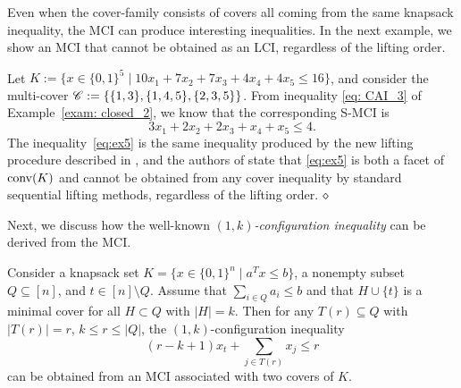 Even when the cover-family consists of covers all coming from the same knapsack inequality, the MCI can produce interesting inequalities. In the next example, we show an MCI that cannot be obtained as an LCI, regardless of the lifting order.

\begin{example}
\label{exmp: 3}
Let $K := \{x \in \{0,1\}^5 \mid 10 x_1 + 7 x_2 + 7 x_3 + 4 x_4 + 4 x_5 \leq 16\}$, and consider the multi-cover $\mathscr{C}: = \{ \{1, 3\}, \{1, 4, 5\}, \{2, 3, 5\}\}$. 
From inequality \eqref{eq: CAI_3} of Example~\ref{exam: closed_2}, we know that the corresponding S-MCI is
\begin{equation}
    3x_1 + 2x_2 + 2x_3 + x_4 + x_5 \leq 4. \label{eq:ex5}
\end{equation}
The inequality~\eqref{eq:ex5} is the same inequality produced by the new lifting procedure described in \cite{letchford2019lifted}, and the authors of \cite{letchford2019lifted} state that \eqref{eq:ex5} is both a facet of $\operatorname{conv}(K)$ and cannot be obtained from any cover inequality by standard sequential lifting methods, regardless of the lifting order.
$\hfill \diamond$
\end{example}

Next, we discuss how the well-known \emph{$(1,k)$-configuration inequality} can be derived from the MCI.

\begin{proposition}
\label{prop: 1-k-AMCI}
Consider a knapsack set $K = \{x \in \{0,1\}^n \mid a^T x \leq b\}$, a nonempty subset $Q \subseteq [n]$, and $t \in [n] \setminus Q$. 
Assume that $\sum_{i \in Q} a_i \leq b$ and that $H \cup \{t\}$ is a minimal cover for all $H \subset Q$ with $|H| = k$.
Then for any $T(r) \subseteq Q$ with $|T(r)| = r$, $k \leq r \leq |Q|$, the $(1,k)$-configuration inequality
$$
(r-k+1) x_t + \sum_{j \in T(r)}x_j \leq r
$$
can be obtained from an MCI associated with two covers of $K$.
\end{proposition}

